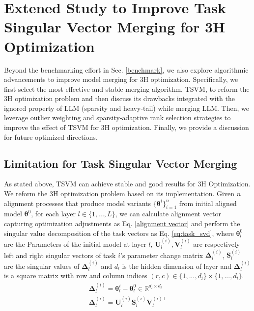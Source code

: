 
\section{Extened Study to Improve Task Singular Vector Merging for 3H Optimization}

Beyond the benchmarking effort in Sec. \ref{benchmark}, we also explore algorithmic advancements to improve model merging for 3H optimization. Specifically, we first select the most effective and stable merging algorithm, TSVM, to reform the 3H optimization problem and then discuss its drawbacks integrated with the ignored property of LLM (sparsity and heavy-tail) while merging LLM. Then, we leverage outlier weighting and sparsity-adaptive rank selection strategies to improve the effect of TSVM for 3H optimization. Finally, we provide a discussion for future optimized directions.

\subsection{Limitation for Task Singular Vector Merging}
As stated above, TSVM can achieve stable and good results for 3H Optimization. We reform the 3H optimization problem based on its implementation. Given $n$ alignment processes that produce model variants $\{\bm{\theta}^{i}\}_{i=1}^n$ from initial aligned model $\bm{\theta}^{0}$, for each layer $l \in \{1,...,L\}$, we can calculate alignment vector capturing optimization adjustments as Eq. \ref{alignment vector} and perform the singular value decomposition of the task vectors as Eq. \ref{eq:task_svd}, where $\bm{\theta}^{0}_{l}$ are the Parameters of the initial model at layer $l$, $\bm{U}^{(i)}_l, \bm{V}^{(i)}_l$ are respectively left and right singular vectors of task $i$'s parameter change matrix $\bm{\Delta}^{(i)}_l$, $\bm{S}^{(i)}_l$ are the singular values of $\bm{\Delta}^{(i)}_l$ and $d_l$ is the hidden dimension of layer and $\bm{\Delta}_l^{(i)}$ is a square matrix with row and column indices $(r,c) \in \{1,...,d_l\} \times \{1,...,d_l\}$. 
\begin{align}
    \label{alignment vector}
    \bm{\Delta}_l^{(i)} = \bm{\theta}^{i}_{l} - \bm{\theta}^{0}_{l} \in \mathbb{R}^{d_l \times d_l} \\[0.5ex] %
    \label{eq:task_svd}
    \bm{\Delta}^{(i)}_{l} = \bm{U}^{(i)}_{l} \bm{S}^{(i)}_{l} \bm{V}_{l}^{(i)\top}
\end{align}

